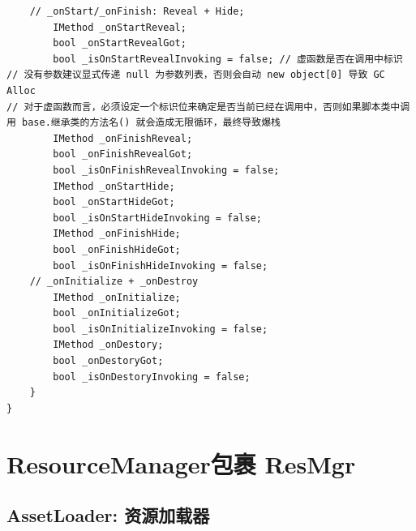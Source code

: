 \documentclass[9pt, b5paper]{article}
\begin{document}
\begin{verbatim}
    // _onStart/_onFinish: Reveal + Hide;
        IMethod _onStartReveal;
        bool _onStartRevealGot;
        bool _isOnStartRevealInvoking = false; // 虚函数是否在调用中标识
// 没有参数建议显式传递 null 为参数列表，否则会自动 new object[0] 导致 GC Alloc
// 对于虚函数而言，必须设定一个标识位来确定是否当前已经在调用中，否则如果脚本类中调用 base.继承类的方法名() 就会造成无限循环，最终导致爆栈
        IMethod _onFinishReveal;
        bool _onFinishRevealGot;
        bool _isOnFinishRevealInvoking = false;
        IMethod _onStartHide;
        bool _onStartHideGot;
        bool _isOnStartHideInvoking = false;
        IMethod _onFinishHide;
        bool _onFinishHideGot;
        bool _isOnFinishHideInvoking = false;
    // _onInitialize + _onDestroy
        IMethod _onInitialize;
        bool _onInitializeGot;
        bool _isOnInitializeInvoking = false;
        IMethod _onDestory;
        bool _onDestoryGot;
        bool _isOnDestoryInvoking = false;
    }
}
\end{verbatim}


\section{ResourceManager包裹  ResMgr}
\label{sec-7}
\subsection{AssetLoader:  资源加载器}
\label{sec-7-1}
\end{document}

